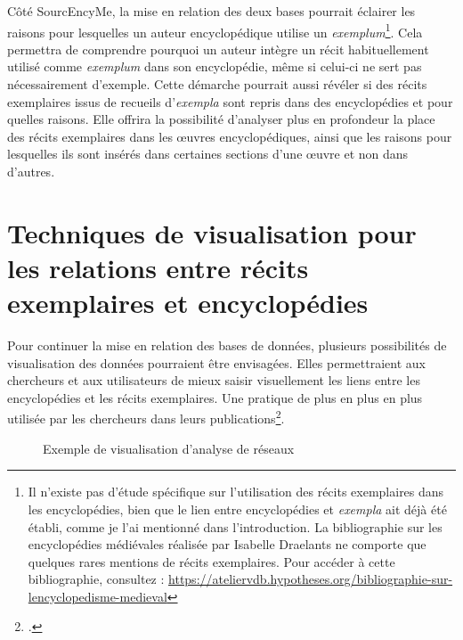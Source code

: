 Côté SourcEncyMe, la mise en relation des deux bases pourrait éclairer les raisons pour lesquelles un auteur encyclopédique utilise un \textit{exemplum}\footnote{Il n'existe pas d'étude spécifique sur l'utilisation des récits exemplaires dans les encyclopédies, bien que le lien entre encyclopédies et \textit{exempla} ait déjà été établi, comme je l'ai mentionné dans l'introduction. La bibliographie sur les encyclopédies médiévales réalisée par Isabelle Draelants ne comporte que quelques rares mentions de récits exemplaires. Pour accéder à cette bibliographie, consultez : \url{https://ateliervdb.hypotheses.org/bibliographie-sur-lencyclopedisme-medieval}}. Cela permettra de comprendre pourquoi un auteur intègre un récit habituellement utilisé comme \textit{exemplum} dans son encyclopédie, même si celui-ci ne sert pas nécessairement d'exemple. Cette démarche pourrait aussi révéler si des récits exemplaires issus de recueils d'\textit{exempla} sont repris dans des encyclopédies et pour quelles raisons. Elle offrira la possibilité d'analyser plus en profondeur la place des récits exemplaires dans les œuvres encyclopédiques, ainsi que les raisons pour lesquelles ils sont insérés dans certaines sections d'une œuvre et non dans d'autres. 


\section{Techniques de visualisation pour les relations entre récits exemplaires et encyclopédies}
Pour continuer la mise en relation des bases de données, plusieurs possibilités de visualisation des données pourraient être envisagées. Elles permettraient aux chercheurs et aux utilisateurs de mieux saisir visuellement les liens entre les encyclopédies et les récits exemplaires. Une pratique de plus en plus en plus utilisée par les chercheurs dans leurs publications\footcite{jiangLiteratureReviewDevelopment2023}. \\

\begin{figure}[H]
	\centering
	\caption{Exemple de visualisation d'analyse de réseaux}
\end{figure}

